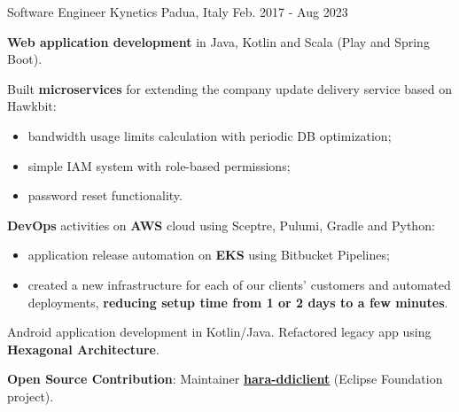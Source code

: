 

\begin{cventries}

  \cventry
    {Software Engineer} %
    {Kynetics} %
    {Padua, Italy} %
    {Feb. 2017 - Aug 2023} %
    {
    \begin{cvitems}
    		\item \textbf{Web application development} in Java, Kotlin and Scala (Play and Spring Boot).
    		\item Built \textbf{microservices} for extending the company update delivery service based on Hawkbit:
    		\begin{itemize}
                    \item bandwidth usage limits calculation with periodic DB optimization;
                    \item simple IAM system with role-based permissions;
                    \item password reset functionality.
            \end{itemize}
    		\item \textbf{DevOps} activities on \textbf{AWS} cloud using Sceptre, Pulumi, Gradle and Python:
    		\begin{itemize}
    			\item application release automation on \textbf{EKS} using Bitbucket Pipelines;
    			\item created a new infrastructure for each of our clients' customers and automated deployments, \textbf{reducing setup time from 1 or 2 days to a few minutes}.
    		\end{itemize}
    		\item Android application development in Kotlin/Java. Refactored legacy app using \textbf{Hexagonal Architecture}.
    		\item \textbf{Open Source Contribution}: Maintainer \textbf{\href{https://github.com/eclipse-hara/hara-ddiclient}{\underline{hara-ddiclient}}} (Eclipse Foundation project).
    \end{cvitems}
    }
\hfill \break

\end{cventries}
